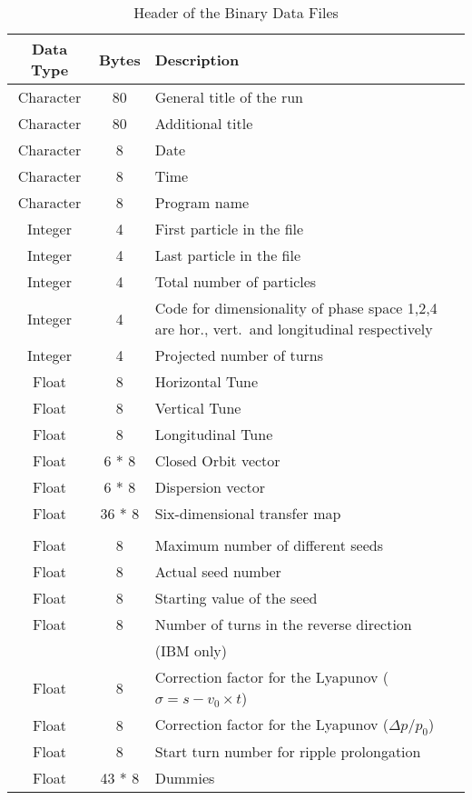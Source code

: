 \begin{table}[h]
    \caption{Header of the Binary Data Files}
    \label{T-HDF}
    \centering
    \begin{tabular}{|c|c|>{\raggedright\arraybackslash}p{8cm}|}
        \hline
        \rowcolor{blue!30}
        \textbf{Data Type} & \textbf{Bytes} & \textbf{Description} \\
        \hline
        Character & 80 & General title of the run \\
        \hline
        Character & 80 & Additional title \\
        \hline
        Character & 8 & Date \\
        \hline
        Character & 8 & Time \\
        \hline
        Character & 8 & Program name \\
        \hline
        Integer & 4 & First particle in the file \\
        \hline
        Integer & 4 & Last particle in the file \\
        \hline
        Integer & 4 & Total number of particles \\
        \hline
        Integer & 4 & Code for dimensionality of phase space 1,2,4 are hor., vert.\ and longitudinal respectively \\
        \hline
        Integer & 4 & Projected number of turns \\
        \hline
        Float & 8 & Horizontal Tune \\
        \hline
        Float & 8 & Vertical Tune \\
        \hline
        Float & 8 & Longitudinal Tune \\
        \hline
        Float & 6 * 8 & Closed Orbit vector \\
        \hline
        Float & 6 * 8 & Dispersion vector \\
        \hline
        Float & 36 * 8 & Six-dimensional transfer map \\
        \hline
        \rowcolor{gray!15}
        \multicolumn{3}{|l|}{50 additional parameters} \\
        \hline
        Float & 8 & Maximum number of different seeds \\
        \hline
        Float & 8 & Actual seed number \\
        \hline
        Float & 8 & Starting value of the seed \\
        \hline
        Float & 8 & Number of turns in the reverse direction \\
        & & (IBM only) \\
        \hline
        Float & 8 & Correction factor for the Lyapunov ($\sigma = s - v_0 \times t$) \\
        \hline
        Float & 8 & Correction factor for the Lyapunov (\mbox{$\Delta p/p_0$}) \\
        \hline
        Float & 8 & Start turn number for ripple prolongation \\
        \hline
        Float & 43 * 8 & Dummies \\
        \hline
    \end{tabular}
\end{table}

